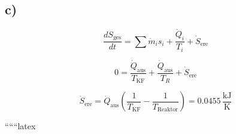 

\subsection*{c)}

\[
\frac{dS_{\text{ges}}}{dt} = \sum \dot{m}_i s_i + \frac{\dot{Q}_i}{T_i} + \dot{S}_{\text{ere}}
\]

\[
0 = \frac{\dot{Q}_{\text{aus}}}{T_{\text{KF}}} + \frac{\dot{Q}_{\text{aus}}}{T_R} + \dot{S}_{\text{ere}}
\]

\[
\dot{S}_{\text{ere}} = \dot{Q}_{\text{aus}} \left( \frac{1}{T_{\text{KF}}} - \frac{1}{T_{\text{Reaktor}}} \right) = 0.0455 \, \frac{\text{kJ}}{\text{K}}
\]

``````latex